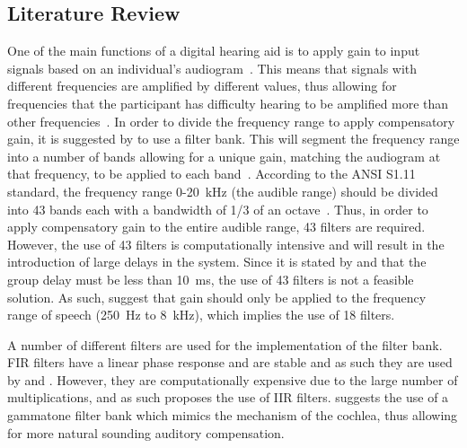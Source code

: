 \documentclass[10pt,twocolumn]{witseiepaper}
\begin{document}
\subsection{Literature Review}
One of the main functions of a digital hearing aid is to apply gain to input signals based on an individual's audiogram~\cite{Survey_of_Filter_Bank_Algorithms}. This means that signals with different frequencies are amplified by different values, thus allowing for frequencies that the participant has difficulty hearing to be amplified more than other frequencies~\cite{Complexity_effective_auditory_compensation}. In order to divide the frequency range to apply compensatory gain, it is suggested by \cite{Survey_of_Filter_Bank_Algorithms, Complexity_effective_auditory_compensation, design_of_IIR_based_digital_hearing_aids, 16-Band_Reconfigurable_Hearing_Aid, Digital_filter_bank_for_hearing_aid, Loudness_compensation_method_based_on_human_auditory} to use a filter bank. This will segment the frequency range into a number of bands allowing for a unique gain, matching the audiogram at that frequency, to be applied to each band~\cite{16-Band_Reconfigurable_Hearing_Aid}. According to the ANSI S1.11 standard, the frequency range 0-20~kHz (the audible range) should be divided into 43 bands each with a bandwidth of 1/3 of an octave~\cite{Survey_of_Filter_Bank_Algorithms, Complexity_effective_auditory_compensation}. Thus, in order to apply compensatory gain to the entire audible range, 43 filters are required. However, the use of 43 filters is computationally intensive and will result in the introduction of large delays in the system. Since it is stated by \cite{An_Ultra_Low-power_Programmable_DSP_System} and \cite{Complexity-effective_auditory_compensation_controllable_filter} that the group delay must be less than 10~ms, the use of 43 filters is not a feasible solution. As such, \cite{16-Band_Reconfigurable_Hearing_Aid, Survey_of_Filter_Bank_Algorithms, Complexity_effective_auditory_compensation} suggest that gain should only be applied to the frequency range of speech (250~Hz to 8~kHz), which implies the use of 18 filters.

A number of different filters are used for the implementation of the filter bank. FIR filters have a linear phase response and are stable and as such they are used by \cite{Digital_filter_bank_for_hearing_aid} and \cite{Complexity-effective_auditory_compensation_controllable_filter}. However, they are computationally expensive due to the large number of multiplications, and as such \cite{Complexity_effective_auditory_compensation} proposes the use of IIR filters. \cite{Loudness_compensation_method_based_on_human_auditory} suggests the use of a gammatone filter bank which mimics the mechanism of the cochlea, thus allowing for more natural sounding auditory compensation. 
\end{document}
